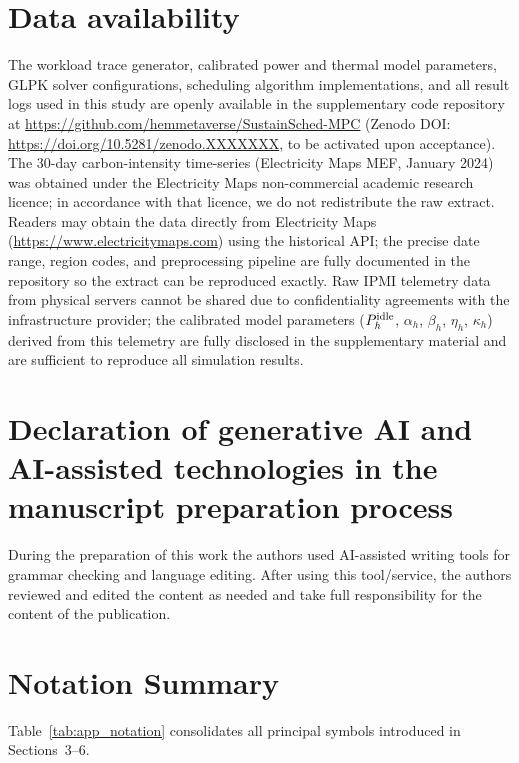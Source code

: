 \documentclass[a4paper,fleqn]{cas-dc}
\begin{document}
\section*{Data availability}
The workload trace generator, calibrated power and thermal model parameters, GLPK solver configurations, scheduling algorithm implementations, and all result logs used in this study are openly available in the supplementary code repository at \url{https://github.com/hemmetaverse/SustainSched-MPC}
(Zenodo DOI: \url{https://doi.org/10.5281/zenodo.XXXXXXX}, to be activated upon acceptance).
The 30-day carbon-intensity time-series (Electricity Maps MEF, January 2024) was obtained under the Electricity Maps non-commercial academic research licence; in accordance with that licence, we do not redistribute the raw extract. Readers may obtain the data directly from Electricity Maps (\url{https://www.electricitymaps.com}) using the historical API; the precise date range, region codes, and preprocessing pipeline are fully documented in the repository so the extract can be reproduced exactly. Raw IPMI telemetry data from physical servers cannot be shared due to confidentiality agreements with the infrastructure provider; the calibrated model parameters ($P^{\rm idle}_h$, $\alpha_h$, $\beta_h$, $\eta_h$, $\kappa_h$) derived from this telemetry are fully disclosed in the supplementary material and are sufficient to reproduce all simulation results.

\section*{Declaration of generative AI and AI-assisted technologies in the manuscript preparation process}
During the preparation of this work the authors used AI-assisted writing tools for grammar checking and language editing. After using this tool/service, the authors reviewed and edited the content as needed and take full responsibility for the content of the publication.
\FloatBarrier
\appendix
\section{Notation Summary}
\label{app:notation}

Table~\ref{tab:app_notation} consolidates all principal symbols introduced in Sections~3--6.
\end{document}
